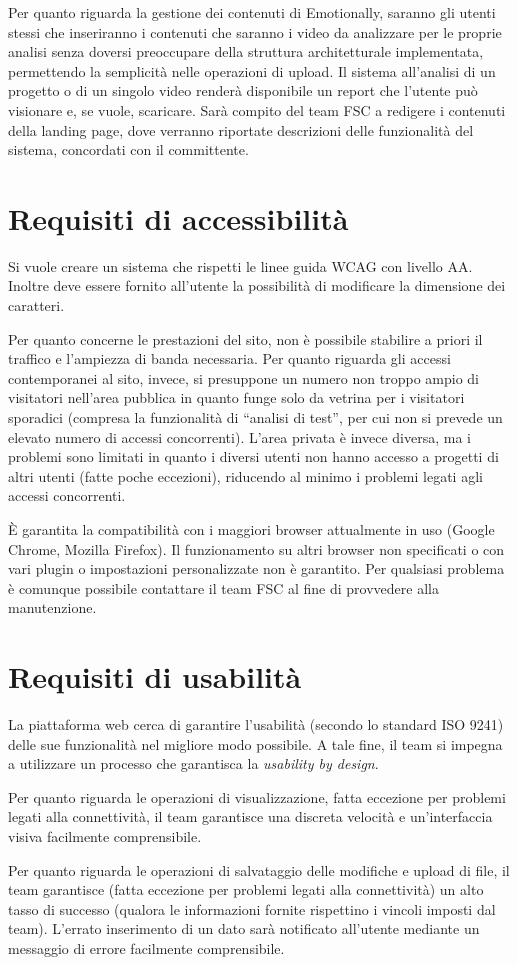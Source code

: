 Per quanto riguarda la gestione dei contenuti di Emotionally, saranno gli 
utenti stessi che inseriranno i contenuti che saranno i video da analizzare per 
le proprie analisi senza doversi preoccupare della struttura architetturale 
implementata, permettendo la semplicità nelle operazioni di upload. Il sistema 
all'analisi di un progetto o di un singolo video renderà disponibile un report 
che l'utente può visionare e, se vuole, scaricare. 
Sarà compito del team FSC a redigere i contenuti della landing page, dove 
verranno riportate descrizioni delle funzionalità del sistema, concordati con 
il committente.

\section{Requisiti di accessibilità}\label{sec:requisiti-di-accessibilita}
Si vuole creare un sistema che rispetti le linee guida WCAG con livello AA. 
Inoltre deve essere fornito all'utente la possibilità di modificare la 
dimensione dei caratteri.

Per quanto concerne le prestazioni del sito, non è possibile stabilire a priori 
il traffico e l'ampiezza di banda necessaria. Per quanto riguarda gli accessi 
contemporanei al sito, invece, si presuppone un numero non troppo ampio di 
visitatori nell'area pubblica in quanto funge solo da vetrina per i visitatori 
sporadici (compresa la funzionalità di ``analisi di test'', per cui non si 
prevede un elevato numero di accessi concorrenti). L'area privata è invece 
diversa, ma i problemi sono limitati in quanto i diversi utenti non hanno 
accesso a progetti di altri utenti (fatte poche eccezioni), riducendo al minimo 
i problemi legati agli accessi concorrenti.

È garantita la compatibilità con i maggiori browser attualmente in uso (Google 
Chrome, Mozilla Firefox). Il funzionamento su altri browser non specificati o 
con vari plugin o impostazioni personalizzate non è garantito. Per qualsiasi 
problema è comunque possibile contattare il team FSC al fine di provvedere alla 
manutenzione.

\section{Requisiti di usabilità}\label{sec:requisiti-di-usabilita}
La piattaforma web cerca di garantire l'usabilità (secondo lo standard ISO 
9241) delle sue funzionalità nel migliore modo possibile. A tale fine, il team 
si impegna a utilizzare un processo che garantisca la \textit{usability by 
design}.

Per quanto riguarda le operazioni di visualizzazione, fatta eccezione per 
problemi legati alla connettività, il team garantisce una discreta velocità e 
un'interfaccia visiva facilmente comprensibile.

Per quanto riguarda le operazioni di salvataggio delle modifiche e upload di 
file, il team garantisce (fatta eccezione per problemi legati alla 
connettività) un alto tasso di successo (qualora le informazioni fornite 
rispettino i vincoli imposti dal team). L'errato inserimento di un dato sarà 
notificato all'utente mediante un messaggio di errore facilmente comprensibile.
